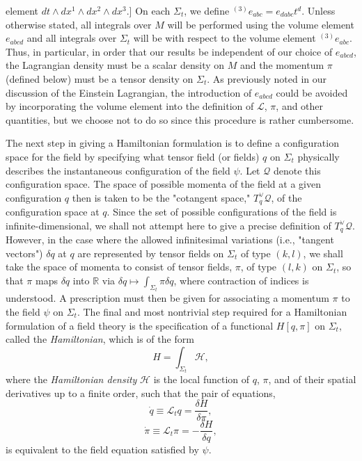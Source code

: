 element \(dt\wedge dx^1\wedge dx^2\wedge dx^3\).] On each \(\Sigma_t\), we define
\({}^{(3)}e_{abc}=e_{dabc}t^d\). Unless otherwise stated, all integrals over \(M\)
will be performed using the volume element \(e_{abcd}\) and all integrals over
\(\Sigma_t\) will be with respect to the volume element \({}^{(3)}e_{abc}\). Thus,
in particular, in order that our results be independent of our choice of
\(e_{abcd}\), the Lagrangian density must be a scalar density on \(M\) and the
momentum \(\pi\) (defined below) must be a tensor density on \(\Sigma_t\). As
previously noted in our discussion of the Einstein Lagrangian, the introduction of
\(e_{abcd}\) could be avoided by incorporating the volume element into the
definition of \(\mathcal L\), \(\pi\), and other quantities, but we choose not to do
so since this procedure is rather cumbersome.

The next step in giving a Hamiltonian formulation is to define a configuration
space for the field by specifying what tensor field (or fields) \(q\) on \(\Sigma_t\)
physically describes the instantaneous configuration of the field \(\psi\). Let
\(\mathcal Q\) denote this configuration space. The space of possible momenta of the
field at a given configuration \(q\) then is taken to be the "cotangent space,"
\(T_q^\vee\mathcal Q\), of the configuration space at \(q\). Since the set of possible
configurations of the field is infinite-dimensional, we shall not attempt here to
give a precise definition of \(T_q^\vee\mathcal Q\). However, in the case where the
allowed infinitesimal variations (i.e., "tangent vectors") \(\delta q\) at \(q\)
are represented by tensor fields on \(\Sigma_t\) of type \((k,l)\), we shall take the
space of momenta to consist of tensor fields, \(\pi\), of type \((l,k)\) on
\(\Sigma_t\), so that \(\pi\) maps \(\delta q\) into \(\mathbb R\) via
\(\delta q\mapsto\int_{\Sigma_t}\pi\delta q\), where contraction of indices is
understood. A prescription must then be given for associating a momentum \(\pi\) to
the field \(\psi\) on \(\Sigma_t\). The final and most nontrivial step required for a
Hamiltonian formulation of a field theory is the specification of a functional
\(H[q,\pi]\) on \(\Sigma_t\), called the \emph{Hamiltonian}, which is of the form
\begin{equation}
  H=\int_{\Sigma_t}\mathcal H,
  \tag{E.2.1}\label{eq:E.2.1}
\end{equation}
where the \emph{Hamiltonian density} \(\mathcal H\) is the local function of
\(q\), \(\pi\), and of their spatial derivatives up to a finite order, such that the
pair of equations,
\begin{equation}
  \dot q\equiv\mathcal L_tq=\frac{\delta H}{\delta\pi},
  \tag{E.2.2}\label{eq:E.2.2}
\end{equation}
\begin{equation}
  \dot\pi\equiv\mathcal L_t\pi=-\frac{\delta H}{\delta q},
  \tag{E.2.3}\label{eq:E.2.3}
\end{equation}
is equivalent to the field equation satisfied by \(\psi\).

